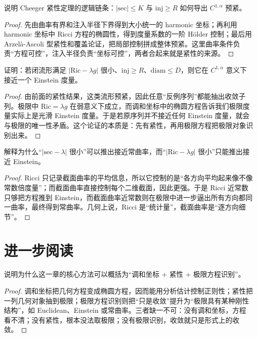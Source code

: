 \documentclass[11pt,a4paper,openany]{ctexbook}
\numberwithin{equation}{chapter}
\begin{document}
\begin{problem}
说明 Cheeger 紧性定理的逻辑链条：\(|\mathrm{sec}|\le K\) 与 \(\mathrm{inj}\ge R\) 如何导出 \(C^{1,\alpha}\) 预紧。
\end{problem}
\begin{proof}
先由曲率有界和注入半径下界得到大小统一的 harmonic 坐标；再利用 harmonic 坐标中 Ricci 方程的椭圆性，得到度量系数的一阶 Hölder 控制；最后用 Arzelà-Ascoli 型紧性和覆盖论证，把局部控制拼成整体预紧。这里曲率条件负责“方程可控”，注入半径负责“坐标可控”，两者合起来就是紧性的来源。  
\end{proof}

\begin{problem}
证明：若闭流形满足 \(|\mathrm{Ric}-\lambda g|\) 很小、\(\mathrm{inj}\ge R\)、\(\mathrm{diam}\le D\)，则它在 \(C^{1,\alpha}\) 意义下接近一个 Einstein 度量。
\end{problem}
\begin{proof}
由前面的紧性结果，这类流形预紧，因此任意“反例序列”都能抽出收敛子列。极限中 \(\mathrm{Ric}=\lambda g\) 在弱意义下成立，而调和坐标中的椭圆方程告诉我们极限度量实际上是光滑 Einstein 度量。于是若原序列并不接近任何 Einstein 度量，就会与极限的唯一性矛盾。这个论证的本质是：先有紧性，再用极限方程把极限对象识别出来。  
\end{proof}

\begin{problem}
解释为什么“\(|\mathrm{sec}-\lambda|\) 很小”可以推出接近常曲率，而“\(|\mathrm{Ric}-\lambda g|\) 很小”只能推出接近 Einstein。
\end{problem}
\begin{proof}
Ricci 只记录截面曲率的平均信息，所以它控制的是“各方向平均起来像不像常数倍度量”；而截面曲率直接控制每个二维截面，因此更强。于是 Ricci 近常数只够把方程推到 Einstein，而截面曲率近常数则在极限中进一步逼出所有方向都同一曲率，最终得到常曲率。几何上说，Ricci 是“统计量”，截面曲率是“逐方向细节”。  
\end{proof}

\section{进一步阅读}

\begin{problem}
说明为什么这一章的核心方法可以概括为“调和坐标 + 紧性 + 极限方程识别”。
\end{problem}
\begin{proof}
调和坐标把几何方程变成椭圆方程，因而能用分析估计控制正则性；紧性把一列几何对象抽到极限；极限方程识别则把“只是收敛”提升为“极限具有某种刚性结构”，如 Euclidean、Einstein 或常曲率。三者缺一不可：没有调和坐标，方程看不清；没有紧性，根本没法取极限；没有极限识别，收敛就只是形式上的收敛。  
\end{proof}
\end{document}
